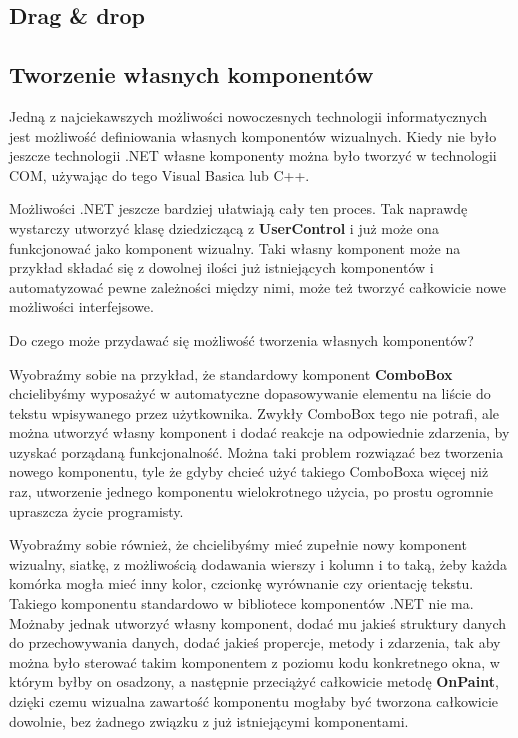 ﻿\subsection{Drag \& drop}

\subsection{Tworzenie własnych komponentów}

Jedną z najciekawszych możliwości nowoczesnych technologii informatycznych jest możliwość definiowania
własnych komponentów wizualnych. Kiedy nie było jeszcze technologii .NET własne komponenty można było
tworzyć w technologii COM, używając do tego Visual Basica lub C++. 

Możliwości .NET jeszcze bardziej ułatwiają cały ten proces. Tak naprawdę wystarczy utworzyć klasę
dziedziczącą z {\bf UserControl} i już może ona funkcjonować jako komponent wizualny. Taki własny
komponent może na przykład składać się z dowolnej ilości już istniejących komponentów i automatyzować
pewne zależności między nimi, może też tworzyć całkowicie nowe możliwości interfejsowe.

Do czego może przydawać się możliwość tworzenia własnych komponentów? 

Wyobraźmy sobie na przykład, że
standardowy komponent {\bf ComboBox} chcielibyśmy wyposażyć w automatyczne dopasowywanie elementu na liście
do tekstu wpisywanego przez użytkownika. Zwykły ComboBox tego nie potrafi, ale można utworzyć własny
komponent i dodać reakcje na odpowiednie zdarzenia, by uzyskać porządaną funkcjonalność. Można taki problem
rozwiązać bez tworzenia nowego komponentu, tyle że gdyby chcieć użyć takiego ComboBoxa więcej niż raz,
utworzenie jednego komponentu wielokrotnego użycia, po prostu ogromnie upraszcza życie programisty.

Wyobraźmy sobie również, że chcielibyśmy mieć zupełnie nowy komponent wizualny, siatkę, z możliwością
dodawania wierszy i kolumn i to taką, żeby każda komórka mogła mieć inny kolor, czcionkę wyrównanie czy
orientację tekstu. Takiego komponentu standardowo w bibliotece komponentów .NET nie ma.
Możnaby jednak utworzyć własny komponent, dodać mu jakieś struktury danych do przechowywania danych,
dodać jakieś propercje, metody i zdarzenia, tak aby można było sterować takim komponentem z poziomu kodu
konkretnego okna, w którym byłby on osadzony, a następnie przeciążyć całkowicie metodę {\bf OnPaint}, dzięki
czemu wizualna zawartość komponentu mogłaby być tworzona całkowicie dowolnie, bez żadnego związku z już
istniejącymi komponentami.

